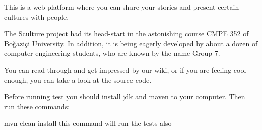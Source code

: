 This is a web platform where you can share your stories and present certain cultures with people.

The Sculture project had its head-\/start in the astonishing course C\+M\+P\+E 352 of Boğaziçi University. In addition, it is being eagerly developed by about a dozen of computer engineering students, who are known by the name Group 7.

You can read through and get impressed by our wiki, or if you are feeling cool enough, you can take a look at the source code.

Before running test you should install jdk and maven to your computer. Then run these commands\+:

{\ttfamily mvn clean install} this command will run the tests also 